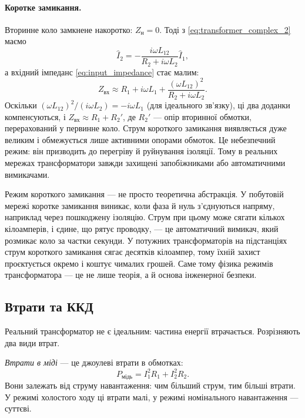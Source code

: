 \paragraph*{Коротке замикання.} Вторинне коло замкнене накоротко:
$Z_{\text{н}}=0$. Тоді з \eqref{eq:transformer_complex_2} маємо
\begin{equation}\label{eq:short_circuit_current}
	\hat{I}_2 = -\frac{i\omega L_{12}}{R_2 + i\omega L_2}\hat{I}_1,
\end{equation}
а вхідний імпеданс \eqref{eq:input_impedance} стає малим:
\begin{equation}\label{eq:short_circuit_impedance}
	Z_{\text{вх}} \approx R_1 + i\omega L_1
	+ \frac{(\omega L_{12})^2}{R_2 + i\omega L_2}.
\end{equation}
Оскільки $(\omega L_{12})^2/(i\omega L_2) = -i\omega L_1$ (для
ідеального зв'язку), ці два доданки компенсуються, і
$Z_{\text{вх}}\approx R_1 + R_2'$, де $R_2'$ --- опір вторинної
обмотки, перерахований у первинне коло. Струм короткого
замикання виявляється дуже великим і обмежується лише активними
опорами обмоток. Це небезпечний режим: він призводить до
перегріву й руйнування ізоляції. Тому в реальних мережах
трансформатори завжди захищені запобіжниками або автоматичними
вимикачами.

\begin{Attention}
	Режим короткого замикання --- не просто теоретична
	абстракція. У побутовій мережі коротке замикання виникає,
	коли фаза й нуль з'єднуються напряму, наприклад через
	пошкоджену ізоляцію. Струм при цьому може сягати кількох кілоамперів, 
	і єдине, що рятує проводку, --- це автоматичний
	вимикач, який розмикає коло за частки секунди. У
	потужних трансформаторів на підстанціях струм короткого
	замикання сягає десятків кілоампер, тому їхній захист
	проєктується окремо і коштує чималих грошей. Саме тому
	фізика режимів трансформатора --- це не лише теорія, а й
	основа інженерної безпеки.
\end{Attention}

\subsection*{Втрати та ККД}

Реальний трансформатор не є ідеальним: частина енергії
втрачається. Розрізняють два види втрат.

\emph{Втрати в міді} --- це джоулеві втрати в обмотках:
\begin{equation}\label{eq:copper_losses}
	P_{\text{мідь}} = I_1^2 R_1 + I_2^2 R_2.
\end{equation}
Вони залежать від струму навантаження: чим більший струм, тим
більші втрати. У режимі холостого ходу ці втрати малі, у режимі
номінального навантаження --- суттєві.

